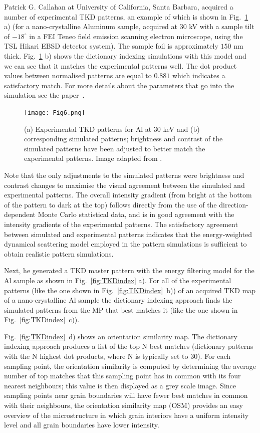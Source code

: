 Patrick G. Callahan at University of California, Santa Barbara, acquired a number of experimental TKD patterns, an example of which is shown in Fig.~\ref{fig:TKDpatternfit} a) (for a nano-crystalline Aluminum sample, acquired at $30$ kV with a sample tilt of $-18^{\circ}$ in a FEI Teneo field emission scanning electron microscope, using the TSL Hikari EBSD detector system). The sample foil is approximately $150$ nm thick.  Fig.~\ref{fig:TKDpatternfit} b) shows the dictionary indexing simulations with this model and we can see that it matches the experimental patterns well. The dot product values between normalised patterns are equal to $0.881$ which indicates a satisfactory match. For more details about the parameters that go into the simulation see the paper~\cite{PascalTKD}.


\begin{figure}[ht]
\centering
\texttt{[image: Fig6.png]}
\caption[Experimental TKD patterns aquired by Patrick G. Callahan for Al at $30$ keV and corresponding simulated patterns]{(a) Experimental TKD patterns for Al at $30$ keV and (b) corresponding simulated patterns; brightness and contrast of the simulated patterns have been adjusted to better match the experimental patterns. Image adapted from \cite{PascalTKD}. }
\label{fig:TKDpatternfit}
\end{figure}

Note that the only adjustments to the simulated patterns were brightness and contrast changes to maximise the visual agreement between the simulated and experimental patterns.  The overall intensity gradient (from bright at the bottom of the pattern to dark at the top) follows directly from the use of the direction-dependent Monte Carlo statistical data, and is in good agreement with the intensity gradients of the experimental patterns.  The satisfactory agreement between simulated and experimental patterns indicates that the energy-weighted dynamical scattering model employed in the pattern simulations is sufficient to obtain realistic pattern simulations. 

Next, he generated a TKD master pattern with the energy filtering model for the Al sample as shown in Fig.~\ref{fig:TKDindex} a). For all of the experimental patterns (like the one shown in  Fig.~\ref{fig:TKDindex}~b)) of an acquired TKD map of a nano-crystalline Al sample  the dictionary indexing approach finds the simulated patterns from the MP that best matches it (like the one shown in Fig.~\ref{fig:TKDindex}~c)). 

Fig.~\ref{fig:TKDindex}~d) shows an orientation similarity map. The dictionary indexing approach produces a list of the top N best matches (dictionary patterns with the N highest dot products, where N is typically set to 30). For each sampling point, the orientation similarity is computed by determining the average number of top matches that this sampling point has in common with its four nearest neighbours; this value is then displayed as a grey scale image. Since sampling points near grain boundaries will have fewer best matches in common with their neighbours, the orientation similarity map (OSM) provides an easy overview of the microstructure in which grain interiors have a uniform intensity level and all grain boundaries have lower intensity.

